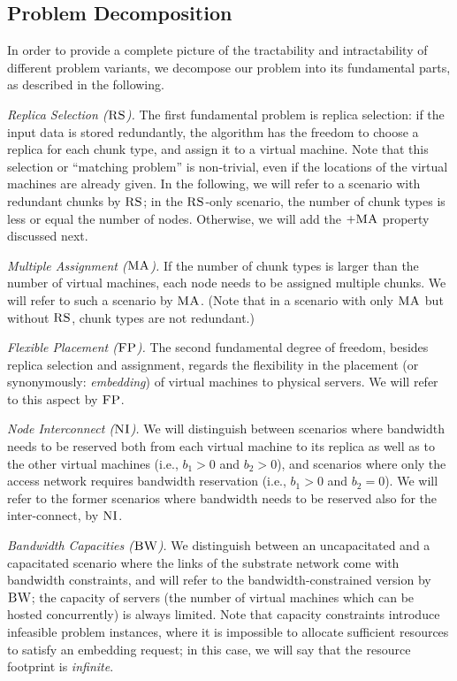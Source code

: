 \documentclass[9pt,twocolumn]{scrartcl}
\newcommand{\CC}{\textsc{NI}}
\newcommand{\FP}{\textsc{FP}}
\newcommand{\RS}{\textsc{RS}}
\newcommand{\BW}{\textsc{BW}}
\newcommand{\MA}{\textsc{MA}}
\newcommand{\CostTrans}{\ensuremath{b_1}}
\newcommand{\CostCom}{\ensuremath{b_2}}
\begin{document}

\subsection{Problem Decomposition}

In order to provide a complete picture of the tractability and intractability of different
problem variants, we decompose our problem into its fundamental parts, as described in the following.

\emph{Replica Selection ($\RS$).} The first fundamental problem is replica selection:
if the input data is stored redundantly, the algorithm has the freedom to choose a replica
for each chunk type, and assign it to a virtual machine. Note that this
selection or ``matching problem'' is non-trivial, even if the locations of the virtual machines
are already given. In the following, we will refer to a scenario
with redundant chunks by $\RS$; in the $\RS$-only scenario, the number of chunk types
is less or equal the number of nodes. Otherwise, we will add the $+\MA$ property discussed next.

\emph{Multiple Assignment ($\MA$).}
If the number of chunk types is larger than the number of virtual machines,
each node needs to be assigned multiple chunks. We will refer to such a scenario by $\MA$.
(Note that in a scenario with only $\MA$ but without $\RS$, chunk types are not redundant.)

\emph{Flexible Placement ($\FP$).} The second fundamental degree of freedom, besides replica selection and assignment,
regards the flexibility in the placement (or synonymously: \emph{embedding}) of virtual machines to physical servers.
We will refer to this aspect by $\FP$.

\emph{Node Interconnect ($\CC$).} We will distinguish between scenarios where bandwidth needs to be reserved
both from each virtual machine to its replica as well as to the other virtual machines
(i.e., $\CostTrans>0$ and $\CostCom>0$), and
 scenarios where only the access network requires bandwidth reservation (i.e., $\CostTrans>0$ and $\CostCom=0$).
 We will refer to the former scenarios
where bandwidth needs to be reserved also for the inter-connect, by $\CC$.

\emph{Bandwidth Capacities ($\BW$).} We distinguish between an uncapacitated and a capacitated scenario where the links
of the substrate network come with bandwidth
constraints, and will refer to the bandwidth-constrained version by $\BW$; the capacity of servers
(the number of virtual machines which can be hosted concurrently) is always limited.
Note that capacity constraints introduce infeasible problem instances, where it is impossible to
allocate sufficient resources to satisfy an embedding request; in this case, we will say that the
resource footprint is \emph{infinite}.
\end{document}

